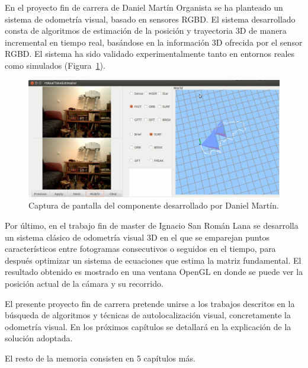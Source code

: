 \newpage

En el proyecto fin de carrera de Daniel Martín Organista \parencite{ref5} se ha planteado un sistema de odometría visual, basado en sensores RGBD. El sistema desarrollado consta de algoritmos de estimación de la posición y trayectoria 3D de manera incremental en tiempo real, basándose en la información 3D ofrecida por el sensor RGBD. El sistema ha sido validado experimentalmente tanto en entornos reales como simulados (Figura~\ref{fig:dani}).

\begin{figure}[th]
\centering
\includegraphics[scale=0.2]{Figures/cap-dani.png}
\decoRule
\caption[Captura de pantalla, PFC de Daniel Martín]{Captura de pantalla del componente desarrollado por Daniel Martín.}
\label{fig:dani}
\end{figure}

Por último, en el trabajo fin de master de Ignacio San Román Lana \parencite{ref4} se desarrolla un sistema clásico de odometría visual 3D en el que se emparejan puntos característicos entre fotogramas consecutivos o seguidos en el tiempo, para después optimizar un sistema de ecuaciones que estima la matriz fundamental. El resultado obtenido es mostrado en una ventana OpenGL en donde se puede ver la posición actual de la cámara y su recorrido.

El presente proyecto fin de carrera pretende unirse a los trabajos descritos en la búsqueda de algoritmos y técnicas de autolocalización visual, concretamente la odometría visual. En los próximos capítulos se detallará en la explicación de la solución adoptada.

El resto de la memoria consisten en 5 capítulos más.